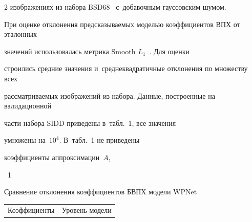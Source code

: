\begin{multicols}{2}
изображениях из набора BSD68~\cite{BSD_set} с~добавочным гауссовским шумом.





При оценке отклонения предсказываемых моделью коэффициентов ВПХ от эталонных 


значений использовалась мет\-ри\-ка Smooth $L_1$~\cite{SMOOTHL1}. Для оценки 


строились сред\-ние значения и~сред\-не\-квад\-ра\-тич\-ные отклонения по множеству всех 


рас\-смат\-ри\-ва\-емых изображений из набора. Данные, по\-стро\-ен\-ные на валидационной 


части набора SIDD приведены в~табл.~1, все значения 


умножены на~$10^4$. В~табл.~1 не приведены 


коэффициенты аппроксимации~$A$,\linebreak\vspace*{-12pt}










\vspace*{-3pt}





\begin{center}


\parbox{79mm}{{{\tablename~1}\ \ \small{Сравнение отклонения коэффициентов БВПХ модели WPNet


}}





}





\vspace*{2ex}








{\small \tabcolsep=4pt


\begin{tabular}{ |l r|c|c|c|c|c| }


\hline


 \multicolumn{2}{|c|}{Коэффициенты} & 


\multicolumn{5}{c|}{Уровень модели} \\ 



\end{tabular}}
\end{center}
\end{multicols}
